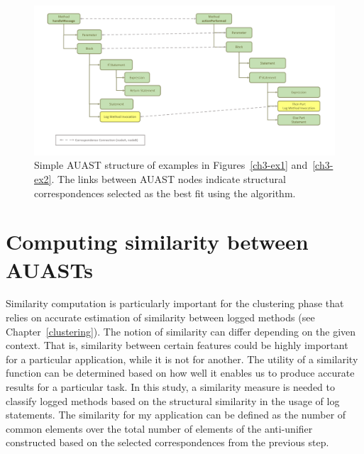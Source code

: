 \begin{figure}
  \centering\includegraphics [width = \textwidth, height=0.5\textheight]{Drawing4/FinalCorr.pdf}
  \caption{Simple AUAST structure of examples in Figures~\ref{ch3-ex1} and~\ref{ch3-ex2}. The links between AUAST nodes indicate structural correspondences selected as the best fit using the  algorithm.}
  \label{fig:AUASTs}
\end{figure}

\section{Computing similarity between AUASTs} \label{meth-similarity}
Similarity computation is particularly important for the clustering phase that relies on accurate estimation of similarity between logged methods (see Chapter~\ref{clustering}). The notion of similarity can differ depending on the given context. That is, similarity between certain features could be highly important for a particular application, while it is not for another. The utility of a similarity function can be determined based on how well it enables us to produce accurate results for a particular task. In this study, a similarity measure is needed to classify logged methods based on the structural similarity in the usage of log statements. The similarity for my application can be defined as the number of common elements over the total number of elements of the anti-unifier constructed based on the selected correspondences from the previous step.

